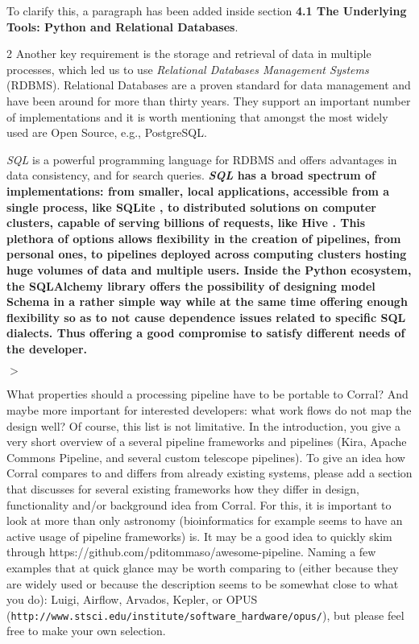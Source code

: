 \documentclass[a4paper,onecolumn,fleqn,usenatbib,useAMS]{mnrasr}
\newenvironment{frshaded}{%
\def\FrameCommand{\fboxrule=\FrameRule\fboxsep=\FrameSep \fcolorbox{framecolor}{shadecolor}}%
\MakeFramed {\FrameRestore}}%
{\endMakeFramed}
\newenvironment{myindentpar}[1]%
 {\begin{list}{}%
         \bigskip
         \color{refereecolor}
         {\setlength{\leftmargin}{#1}}%
         \itshape
         \item[$>$]%
 }
 {\end{list}}
\begin{document}
To clarify this, a paragraph has been added inside section 
\textbf{4.1 The Underlying Tools: Python and Relational Databases}.

\begin{frshaded}
\begin{multicols}{2} 
Another key requirement is the storage and retrieval of data in multiple processes,
which led us to use \textit{Relational Databases Management Systems} (RDBMS).
%
Relational Databases are a proven standard for data management and have been 
around for more than thirty years. They support an important number of 
implementations and it is worth mentioning that amongst the most widely 
used are Open Source, e.g., PostgreSQL.

\textit{SQL} is a powerful programming language for RDBMS and offers
advantages in data consistency, and for search queries.
\bfseries
\textit{SQL} has a broad spectrum of implementations: from smaller,
local applications, accessible from a single process, like SQLite \citep{owens2010sqlite},
to distributed solutions on computer clusters, capable of serving billions of
requests, like Hive \citep{thusoo2009hive}.
%
This plethora of options allows flexibility in the creation of pipelines,
from personal ones, to pipelines deployed across computing clusters hosting
huge volumes of data and multiple users.
%
Inside the Python ecosystem, the SQLAlchemy library offers the possibility of 
designing model Schema in a rather simple way while at the same time 
offering enough flexibility so as to not cause dependence issues 
related to specific SQL dialects. 
%
Thus offering a good compromise to satisfy different needs of the developer.
\mdseries
\end{multicols} 
\end{frshaded} 

\begin{myindentpar}{1cm}
What properties should a processing pipeline have to be portable to
Corral? And maybe more important for interested developers: what work
flows do not map the design well?  Of course, this list is not
limitative.  
In the introduction, you give a very short overview of a
several pipeline frameworks and pipelines (Kira, Apache Commons
Pipeline, and several custom telescope pipelines). 
To give an idea how Corral compares to and differs from already existing systems, please
add a section that discusses for several existing frameworks how they
differ in design, functionality and/or background idea from Corral.
For this, it is important to look at more than only astronomy
(bioinformatics for example seems to have an active usage of pipeline
frameworks) is. 
It may be a good idea to quickly skim through
https://github.com/pditommaso/awesome-pipeline. 
Naming a few examples
that at quick glance may be worth comparing to (either because they
are widely used or because the description seems to be somewhat close
to what you do): Luigi, Airflow, Arvados, Kepler, or OPUS
(\verb|http://www.stsci.edu/institute/software_hardware/opus/|), but please
feel free to make your own selection.
\end{myindentpar}
\end{document}
